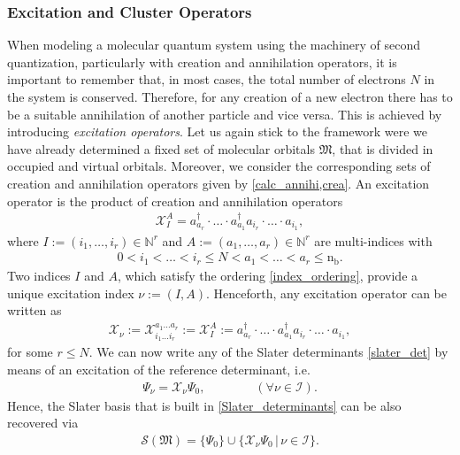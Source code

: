 \documentclass[reqno]{amsart}
\begin{document}
\subsubsection{Excitation and Cluster Operators} When modeling a molecular quantum system using the machinery of second quantization, particularly with creation and annihilation operators, it is important to remember that, in most cases, the total number of electrons $N$ in the system is conserved. Therefore, for any creation of a new electron there has to be a suitable annihilation of another particle and vice versa. This is achieved by introducing \textit{excitation operators}. Let us again stick to the framework were we have already determined a fixed set of molecular orbitals $\mathfrak{M}$, that is divided in occupied and virtual orbitals. Moreover, we consider the corresponding sets of creation and annihilation operators given by \eqref{calc_annihi,crea}. An excitation operator is the product of creation and annihilation operators 
\begin{align}
    \mathscr{X}^A_I=a^\dagger_{a_r} \cdot \ldots \cdot a^\dagger_{a_1} a_{i_r}\cdot \ldots \cdot a_{i_1},
\end{align}
where $I:=(i_1,\ldots,i_r)\in \mathbb{N}^r$ and $A:=(a_1,\ldots,a_r)\in \mathbb{N}^r$ are multi-indices with 
\begin{align}\label{index_ordering}
    0<i_1<\ldots<i_r\le N <a_1<\ldots<a_r\le\text{n}_\text{b}.
\end{align}
Two indices $I$ and $A$, which satisfy the ordering \eqref{index_ordering}, provide a unique excitation index $\nu:=(I,A)$. Henceforth, any excitation operator can be written as
\begin{align}\label{exc_op}
    \mathscr{X}_\nu:=\mathscr{X}^{a_1\ldots a_r}_{i_1\ldots i_r}:=\mathscr{X}^A_I:=a^\dagger_{a_r} \cdot \ldots \cdot a^\dagger_{a_1} a_{i_r}\cdot \ldots \cdot a_{i_1},
\end{align}
for some $r\le N$. We can now write any of the Slater determinants \eqref{slater_det} by means of an excitation of the reference determinant, i.e. 
\begin{align}
    \Psi_\nu=\mathscr{X}_\nu\Psi_0, \qquad\qquad(\forall \nu \in \mathscr{I}).
\end{align}
Hence, the Slater basis that is built in \eqref{Slater_determinants} can be also recovered via
\begin{align}\label{slater_basis_via_exc}
    \mathcal{S}(\mathfrak{M})=\lbrace \Psi_0\rbrace \cup \lbrace \mathscr{X}_\nu\Psi_0\,|\, \nu\in \mathscr{I}\rbrace.
\end{align}
\end{document}

